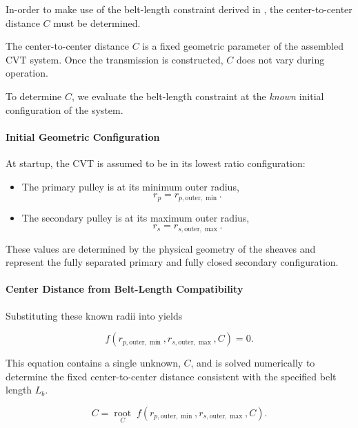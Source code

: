 \documentclass[11pt]{article}
\numberwithin{equation}{section}
\begin{document}
In-order to make use of the belt-length constraint derived in , 
the center-to-center distance $C$ must be determined.

The center-to-center distance $C$ is a fixed geometric parameter
of the assembled CVT system. Once the transmission is constructed,
$C$ does not vary during operation.

To determine $C$, we evaluate the belt-length constraint
 at the \emph{known} initial configuration
of the system.

\paragraph{Initial Geometric Configuration}

At startup, the CVT is assumed to be in its lowest ratio configuration:

\begin{itemize}
    \item The primary pulley is at its minimum outer radius,
    \[
    r_p = r_{p,\text{outer},\min}.
    \]
    \item The secondary pulley is at its maximum outer radius,
    \[
    r_s = r_{s,\text{outer},\max}.
    \]
\end{itemize}

These values are determined by the physical geometry of the sheaves
and represent the fully separated primary and fully closed secondary
configuration.

\paragraph{Center Distance from Belt-Length Compatibility}

Substituting these known radii into
 yields

\begin{equation}
f(r_{p,\text{outer},\min}, r_{s,\text{outer},\max}, C) = 0.
\label{eq:center_distance_constraint}
\end{equation}

This equation contains a single unknown, $C$, and is solved
numerically to determine the fixed center-to-center distance
consistent with the specified belt length $L_b$.

\begin{equation}
C
=
\operatorname*{root}_{C}
\; f\!\left(r_{p,\text{outer},\min}, r_{s,\text{outer},\max}, C\right).
\end{equation}
\end{document}
